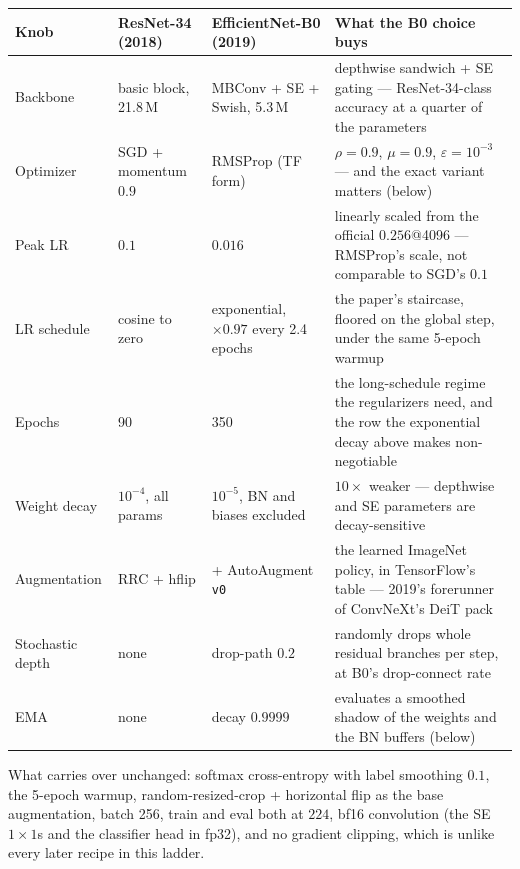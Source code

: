 \begin{center}
\begin{tabular}{@{}l p{2.9cm} p{3.2cm} p{6.3cm}@{}}
\hline
Knob & ResNet-34 (2018) & EfficientNet-B0 (2019) & What the B0 choice buys \\
\hline
Backbone      & basic block, 21.8\,M   & MBConv + SE + Swish, 5.3\,M  & depthwise sandwich + SE gating --- ResNet-34-class accuracy at a quarter of the parameters \\
Optimizer     & SGD + momentum $0.9$   & RMSProp (TF form)             & $\rho{=}0.9$, $\mu{=}0.9$, $\varepsilon{=}10^{-3}$ --- and the exact variant matters (below) \\
Peak LR       & $0.1$                  & $0.016$                       & linearly scaled from the official $0.256$@4096 --- RMSProp's scale, not comparable to SGD's $0.1$ \\
LR schedule   & cosine to zero         & exponential, $\times0.97$ every 2.4 epochs & the paper's staircase, floored on the global step, under the same 5-epoch warmup \\
Epochs        & 90                     & 350                           & the long-schedule regime the regularizers need, and the row the exponential decay above makes non-negotiable \\
Weight decay  & $10^{-4}$, all params  & $10^{-5}$, BN and biases excluded & $10\times$ weaker --- depthwise and SE parameters are decay-sensitive \\
Augmentation  & RRC + hflip            & + AutoAugment \texttt{v0}     & the learned ImageNet policy, in TensorFlow's table --- 2019's forerunner of ConvNeXt's DeiT pack \\
Stochastic depth & none                & drop-path $0.2$               & randomly drops whole residual branches per step, at B0's drop-connect rate \\
EMA           & none                   & decay $0.9999$                & evaluates a smoothed shadow of the weights and the BN buffers (below) \\
\hline
\end{tabular}
\end{center}

\noindent What carries over unchanged: softmax cross-entropy with
label smoothing $0.1$, the 5-epoch warmup, random-resized-crop +
horizontal flip as the base augmentation, batch 256, train and eval
both at $224$, bf16 convolution (the SE $1\times1$s and the classifier
head in fp32), and no gradient clipping, which is unlike every later recipe in
this ladder.

